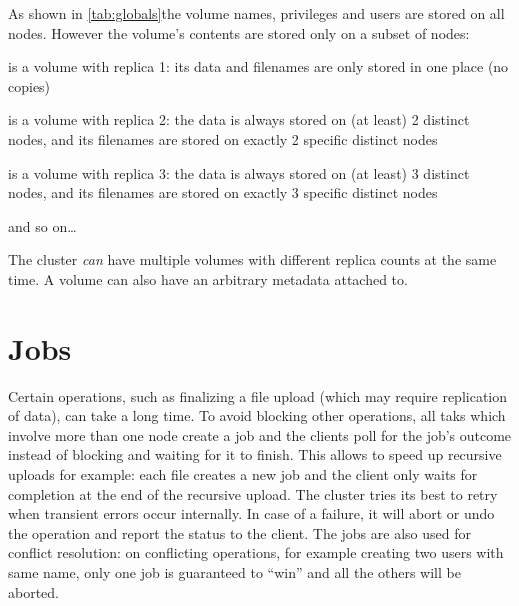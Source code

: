 As shown in \ifpdf{}\else\ref{tab:globals}\fi the volume
names, privileges and users are stored on all nodes. However the volume's
contents are stored only on a subset
of nodes:
\begin{description}
	\item[volA\_r1] is a volume with replica 1: its data and filenames
	are only stored in one place (no copies)
	\item[volB\_r2] is a volume with replica 2: the data is always stored
	on (at least) 2 distinct nodes, and its filenames are stored on exactly
	2 specific distinct nodes
	\item[volC\_r3] is a volume with replica 3: the data is always stored
	on (at least) 3 distinct nodes, and its filenames are stored on exactly
	3 specific distinct nodes
	\item and so on\ldots
\end{description}
The cluster \emph{can} have multiple volumes with different replica counts at
the same time. A volume can also have an arbitrary metadata attached to.


\section{Jobs}
Certain operations, such as finalizing a file upload (which may require
replication of data), can take a long time. To avoid blocking other operations,
all taks which involve more than one node create a job and the \SX clients poll
for the job's outcome instead of blocking and waiting for it to finish. This
allows to speed up recursive uploads for example: each file creates a new job
and the client only waits for completion at the end of the recursive upload.
The cluster tries its best to retry when transient errors occur internally.
In case of a failure, it will abort or undo the operation and report the status
to the client. The jobs are also used for conflict resolution: on conflicting
operations, for example creating two users with same name, only one job is
guaranteed to ``win'' and all the others will be aborted.
